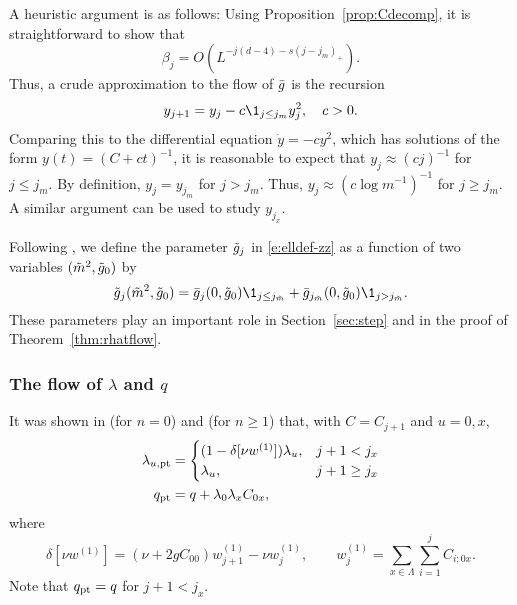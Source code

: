 \begin{rk}
A heuristic argument is as follows:
Using Proposition~\ref{prop:Cdecomp}, it is straightforward to show that
\begin{equation}
\label{e:beta-bd}
\beta_j = O(L^{-j (d - 4) - s (j - j_m)_+}).
\end{equation}
Thus, a crude approximation to the flow of $\bar{g}$ is the recursion
\begin{equation}
y_{j+1} = y_j - c \1_{j \le j_m} y_j^2,
	\quad
c > 0.
\end{equation}
Comparing this to the differential equation $\dot y = - c y^2$, which has solutions
of the form $y(t) = (C + c t)^{-1}$, it is reasonable to expect that $y_j \approx (c j)^{-1}$
for $j \le j_m$. By definition, $y_j = y_{j_m}$ for $j > j_m$. Thus,
$y_j \approx (c \log m^{-1})^{-1}$ for $j \ge j_m$. A similar argument can be used
to study $y_{j_x}$.
\end{rk}

Following \cite[\eqref{log-e:ggendef}]{BBS-saw4-log}, we define the parameter
$\tilde{g}_j$ in \eqref{e:elldef-zz} as a function of two variables $(\tilde{m}^2, \tilde{g}_0)$ by
\begin{equation}
\label{e:ggendef}
\ggen_j(\mgen^2,\ggen_0)
	=
\gbar_j(0,\ggen_0) \1_{j \le j_{\mgen}} + \gbar_{j_{\mgen}}(0,\ggen_0) \1_{j > j_{\mgen}}.
\end{equation}
These parameters play an important role in Section~\ref{sec:step} and in the proof of
Theorem~\ref{thm:rhatflow}.

\subsubsection{The flow of \texorpdfstring{$\lambda$ and $q$}{lambda and q}}

It was shown in \cite[\eqref{pt-e:lambdapt2}--\eqref{pt-e:qpt2}]{BBS-rg-pt} (for $n = 0$)
and \cite[Proposition~\ref{phi4-prop:pt}]{ST-phi4} (for $n \ge 1$) that,
with $C = C_{j+1}$ and $u = 0, x$,
\begin{align}
\label{e:lampt}
\lambda_{u,{\rm pt}}
	&=
\begin{cases}
(1 - \delta[\nu w^{(1)}]) \lambda_u,
	& j + 1 < j_x \\
\lambda_u,
	& j + 1 \ge j_x
\end{cases}
	\\
\label{e:qpt}
q_{\rm pt}
	&=
q + \lambda_0 \lambda_x C_{0x},
\end{align}
where
\begin{equation}
\label{e:deltanuw1}
\delta[\nu w^{(1)}] = (\nu + 2 g C_{00}) w^{(1)}_{j+1} - \nu w^{(1)}_j,
	\qquad
w^{(1)}_j = \sum_{x\in\Lambda} \sum_{i=1}^j C_{i;0x}.
\end{equation}
Note that $q_{\rm pt} = q$ for $j + 1 < j_x$.

